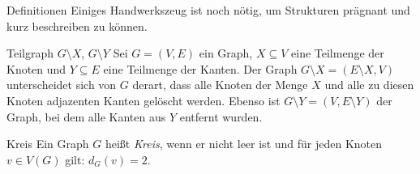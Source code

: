 \begin{chapter}{Definitionen}
  Einiges Handwerkszeug ist noch nötig, um Strukturen prägnant und kurz beschreiben zu können.
  
  \begin{definition}{Teilgraph $G\setminus X$, $G\setminus Y$}
   Sei $G=(V,E)$ ein Graph, $X \subseteq V$ eine Teilmenge der Knoten und $Y \subseteq E$ eine Teilmenge der Kanten. Der Graph $G\setminus X = (E\setminus X,V)$ unterscheidet sich von $G$ derart, dass alle Knoten der Menge $X$ und alle zu diesen Knoten adjazenten Kanten gelöscht werden. Ebenso ist $G\setminus Y = (V,E\setminus Y)$ der Graph, bei dem alle Kanten aus $Y$ entfernt wurden.
  \end{definition}
  
  \begin{definition}{Kreis}
   Ein Graph $G$ heißt \textit{Kreis}, wenn er nicht leer ist und für jeden Knoten $v\in V(G)$ gilt: $d_G(v) = 2$.
  \end{definition}
\end{chapter}